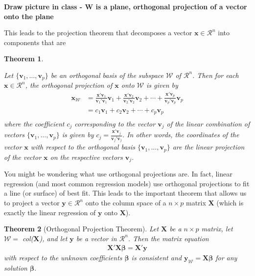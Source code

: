 \documentclass[
]{book}
\newtheorem{theorem}{Theorem}[chapter]
\theoremstyle{definition}
\theoremstyle{definition}
\theoremstyle{definition}
\theoremstyle{remark}
\begin{document}
\textbf{Draw picture in class - W is a plane, orthogonal projection of a vector onto the plane}

This leads to the projection theorem that decomposes a vector \(\mathbf{x} \in \mathcal{R}^n\) into components that are

\begin{theorem}
\protect\hypertarget{thm:unlabeled-div-199}{}\label{thm:unlabeled-div-199}

Let \(\{ \mathbf{v}_1, \ldots, \mathbf{v}_p \}\) be an orthogonal basis of the subspace \(\mathcal{W}\) of \(\mathcal{R}^n\). Then for each \(\mathbf{x} \in \mathcal{R}^n\), the orthogonal projection of \(\mathbf{x}\) onto \(\mathcal{W}\) is given by
\[
\begin{aligned}
\mathbf{x}_{\mathcal{W}} & = \frac{\mathbf{x}'\mathbf{v}_1}{\mathbf{v}_1'\mathbf{v}_1} \mathbf{v}_1 + \frac{\mathbf{x}'\mathbf{v}_2}{\mathbf{v}_2'\mathbf{v}_2} \mathbf{v}_2 + \cdots +  \frac{\mathbf{x}'\mathbf{v}_p}{\mathbf{v}_p'\mathbf{v}_p} \mathbf{v}_p \\
& = c_1 \mathbf{v}_1 + c_2 \mathbf{v}_2 + \cdots + c_p \mathbf{v}_p \\
\end{aligned}
\]
where the coefficient \(c_j\) corresponding to the vector \(\mathbf{v}_j\) of the linear combination of vectors \(\{ \mathbf{v}_1, \ldots, \mathbf{v}_p \}\) is given by \(c_j = \frac{\mathbf{x}'\mathbf{v}_j}{\mathbf{v}_j'\mathbf{v}_j}\). In other words, the coordinates of the vector \(\mathbf{x}\) with respect to the orthogonal basis \(\{ \mathbf{v}_1, \ldots, \mathbf{v}_p \}\) are the linear projection of the vector \(\mathbf{x}\) on the respective vectors \(\mathbf{v}_j\).

\end{theorem}

You might be wondering what use orthogonal projections are. In fact, linear regression (and most common regression models) use orthogonal projections to fit a line (or surface) of best fit. This leads to the important theorem that allows us to project a vector \(\mathbf{y} \in \mathcal{R}^n\) onto the column space of a \(n \times p\) matrix \(\mathbf{X}\) (which is exactly the linear regression of \(\mathbf{y}\) onto \(\mathbf{X}\)).

\begin{theorem}[Orthogonal Projection Theorem]
\protect\hypertarget{thm:orthogonal-matrix-projection}{}{\label{thm:orthogonal-matrix-projection} {} }Let \(\mathbf{X}\) be a \(n \times p\) matrix, let \(\mathcal{W} =\) col(\(\mathbf{X}\)), and let \(\mathbf{y}\) be a vector in \(\mathcal{R}^n\). Then the matrix equation
\[
\begin{aligned}
\mathbf{X}'\mathbf{X} \boldsymbol{\beta} = \mathbf{X}' \mathbf{y}
\end{aligned}
\]
with respect to the unknown coefficients \(\boldsymbol{\beta}\) is consistent and \(\mathbf{y}_{\mathcal{W}} = \mathbf{X}\boldsymbol{\beta}\) for any solution \(\boldsymbol{\beta}\).
\end{theorem}
\end{document}
